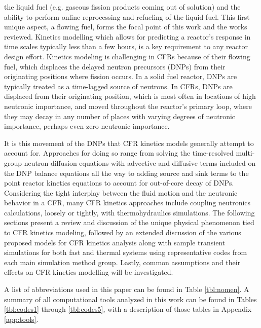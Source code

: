 \documentclass[review]{elsarticle}
\begin{document}
 the liquid fuel (e.g. gaseous fission products coming out of solution)
and the ability to perform online reprocessing and refueling of the liquid fuel.
 This first unique aspect, a flowing fuel, forms the focal point of this work and the
  works reviewed. Kinetics modelling which allows for predicting
a reactor's response in time scales typically less than a few hours, is a key
requirement to any reactor design effort. Kinetics modeling is challenging in CFRs
because of their flowing fuel, which displaces the delayed neutron precursors
 (DNPs) from their originating positions where fission occurs. In a solid fuel
reactor, DNPs are typically treated as a time-lagged source of neutrons.
In CFRs, DNPs are displaced from their originating position, which is 
most often in locations
of high neutronic importance, and moved throughout the reactor's primary loop,
where they may decay in any number of places with varying degrees of
neutronic importance, perhaps even zero neutronic importance. 
\par It is this movement of the DNPs that CFR kinetics models generally
attempt to account for. Approaches for doing so range from solving the 
time-resolved multi-group neutron diffusion equations with advective and
diffusive terms included on the DNP balance equations all the way to adding
source and sink terms to the point reactor kinetics equations to account
for out-of-core decay of DNPs. Considering the tight interplay between the
fluid motion and the neutronic behavior in a CFR, many CFR kinetics approaches
include coupling neutronics calculations, loosely or tightly, 
with thermohydraulics simulations. The
following sections present a review and discussion of the
unique physical phenomenon tied to CFR kinetics modeling, 
followed by an extended discussion of the various proposed models for CFR
kinetics analysis along with sample transient simulations for
both fast and thermal systems using representative codes from each main
simulation method group. Lastly, common assumptions and their effects on CFR
kinetics modelling will be investigated.
\par A list of abbreviations used in this paper can be found in Table
\ref{tbl:nomen}. A summary of all computational tools analyzed
in this work can be found in Tables \ref{tbl:codes1} through \ref{tbl:codes5},
 with a description of those tables in Appendix \ref{app:tools}.
\end{document}
